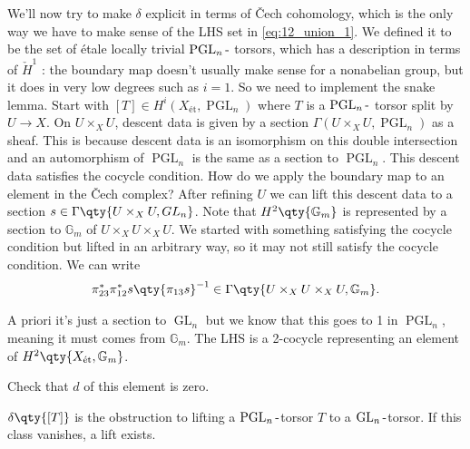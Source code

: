 We'll now try to make \(\delta\) explicit in terms of Čech cohomology,
which is the only way we have to make sense of the LHS set in
\cref{eq:12_union_1}. We defined it to be the set of étale locally
trivial \(\operatorname{PGL}_n{\hbox{-}}\) torsors, which has a
description in terms of \({\check{H}}^1\) : the boundary map doesn't
usually make sense for a nonabelian group, but it does in very low
degrees such as \(i=1\). So we need to implement the snake lemma. Start
with \([T]\in H^i(X_\text{ét}, \operatorname{PGL}_n)\) where \(T\) is a
\(\operatorname{PGL}_n{\hbox{-}}\) torsor split by \(U\xrightarrow{}X\).
On \(U\times_X U\), descent data is given by a section
\(\Gamma(U\times_X U, \operatorname{PGL}_n)\) as a sheaf. This is
because descent data is an isomorphism on this double intersection and
an automorphism of \(\operatorname{PGL}_n\) is the same as a section to
\(\operatorname{PGL}_n\). This descent data satisfies the cocycle
condition. How do we apply the boundary map to an element in the Čech
complex? After refining \(U\) we can lift this descent data to a section
\(s\in \Gamma\qty{U\times_{X}U,GL_{n}}\). Note that
\(H^{2}\qty{{\mathbb{G}}_{m}}\) is represented by a section to
\({\mathbb{G}}_{m}\) of \(U\times_{X}U\times_{X}U\). We started with
something satisfying the cocycle condition but lifted in an arbitrary
way, so it may not still satisfy the cocycle condition. We can write
\begin{align*}  
\pi_{23}^{*}\pi_{12}^{*}s \qty{\pi_{13}s}^{-1}
\in \Gamma\qty{U\times_{X}U\times_{X}U, {\mathbb{G}}_{m}}
.\end{align*}

A priori it's just a section to \(\operatorname{GL}_{n}\) but we know
that this goes to 1 in \(\operatorname{PGL}_{n}\), meaning it must comes
from \({\mathbb{G}}_{m}\). The LHS is a 2-cocycle representing an
element of \(H^{2}\qty{X_{\text{ét}}, {\mathbb{G}}_{m}}\).

\begin{exercise}[?]

Check that \(d\) of this element is zero.

\end{exercise}

\begin{slogan}

\(\delta\qty{[T]}\) is the obstruction to lifting a
\(\operatorname{PGL}_{n}{\hbox{-}}\)torsor \(T\) to a
\(\operatorname{GL}_{n}{\hbox{-}}\)torsor. If this class vanishes, a
lift exists.

\end{slogan}

